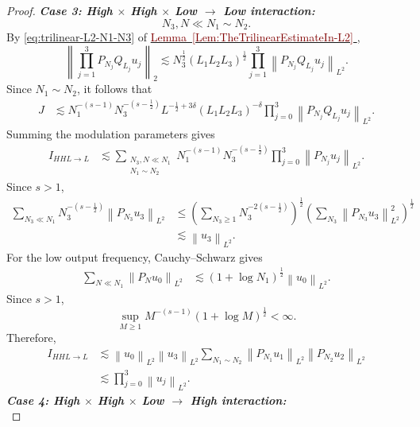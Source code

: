 \documentclass[12pt,oneside,reqno]{amsart}
\newcommand{\lemref}[1]{%
    \hyperref[#1]{%
        \textcolor{Maroon}{Lemma~\ref*{#1}}%
    }%
}
\numberwithin{equation}{section}
\theoremstyle{plain}
\newcommand{\Lpn}[2]{%
    \left\lVert #1\right\rVert_{L^{#2}}%
}
\newcommand{\Ifr}[4]{%
    I_{{#1}{#2}{#3}\to{#4}}%
}
\begin{document}
\begin{proof}
\noindent
\textbf{\emph{Case 3: High $\times$ High $\times$ Low $\to$ Low interaction:}}
\begin{equation}
    N_3,N\ll N_1\sim N_2.
\end{equation}
By \eqref{eq:trilinear-L2-N1-N3} of
\lemref{Lem:TheTrilinearEstimateIn-L2},
\begin{equation}
    \left\|
        \prod_{j=1}^3
        P_{N_j}Q_{L_j}u_j
    \right\|_2
    \lesssim
    N_3^{\frac12}
    (L_1L_2L_3)^{\frac12}
    \prod_{j=1}^3
    \Lpn{P_{N_j}Q_{L_j}u_j}{2}.
\end{equation}
Since $N_1\sim N_2$, it follows that
\begin{align}
J
&\lesssim
N_1^{-(s-1)}
N_3^{-(s-\frac12)}
L^{-\frac12+3\delta}
(L_1L_2L_3)^{-\delta}
\prod_{j=0}^3
\Lpn{P_{N_j}Q_{L_j}u_j}{2}.
\label{eq:case3-dyadic}
\end{align}
Summing the modulation parameters gives
\begin{align}
\Ifr{H}{H}{L}{L}
&\lesssim
\sum_{\substack{
N_3,N\ll N_1\\
N_1\sim N_2
}}
N_1^{-(s-1)}
N_3^{-(s-\frac12)}
\prod_{j=0}^3
\Lpn{P_{N_j}u_j}{2}.
\label{eq:case3-spatial}
\end{align}
Since $s>1$,
\begin{align}
\sum_{N_3\ll N_1}
N_3^{-(s-\frac12)}
\Lpn{P_{N_3}u_3}{2}
&\leq
\left(
    \sum_{N_3\geq1}
    N_3^{-2(s-\frac12)}
\right)^{\frac12}
\left(
    \sum_{N_3}
    \Lpn{P_{N_3}u_3}{2}^2
\right)^{\frac12}
\nonumber\\
&\lesssim
\Lpn{u_3}{2}.
\label{eq:case3-N3-sum}
\end{align}
For the low output frequency, Cauchy--Schwarz gives
\begin{align}
\sum_{N\ll N_1}
\Lpn{P_Nu_0}{2}
&\lesssim
(1+\log N_1)^{\frac12}
\Lpn{u_0}{2}.
\label{eq:case3-low-output}
\end{align}
Since $s>1$,
\begin{equation}
\label{eq:case3-log-absorption}
    \sup_{M\geq1}
    M^{-(s-1)}
    (1+\log M)^{\frac12}
    <\infty.
\end{equation}
Therefore,
\begin{align}
\Ifr{H}{H}{L}{L}
&\lesssim
\Lpn{u_0}{2}\Lpn{u_3}{2}
\sum_{N_1\sim N_2}
\Lpn{P_{N_1}u_1}{2}
\Lpn{P_{N_2}u_2}{2}
\nonumber\\
&\lesssim
\prod_{j=0}^3
\Lpn{u_j}{2}.
\label{eq:case3-final}
\end{align}
\noindent
\textbf{\emph{Case 4: High $\times$ High $\times$ Low $\to$ High interaction:}}
\begin{equation}

\end{equation}
\end{proof}
\end{document}
